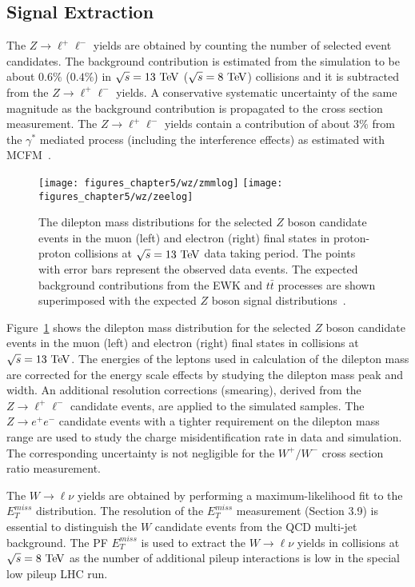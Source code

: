 \subsection{Signal Extraction}

The $Z\rightarrow \ell^{+}\ell^{-}$ yields are obtained by counting the number of selected event candidates. The background contribution is estimated from the simulation to be about $0.6\%$ ($0.4\%$) in $\sqrt{s}=13~\mathrm{Te\kern -0.1em V}$ ($\sqrt{s}=8~\mathrm{Te\kern -0.1em V}$) collisions and it is subtracted from the $Z\rightarrow \ell^{+}\ell^{-}$ yields. A conservative systematic uncertainty of the same magnitude as the background contribution is propagated to the cross section measurement. The $Z\rightarrow \ell^{+}\ell^{-}$ yields contain a contribution of about $3\%$ from the $\gamma^{*}$ mediated process (including the interference effects) as estimated with MCFM~\cite{Campbell:2010ff}. 
\begin{figure}[htbp]
\centering
\texttt{[image: figures\_chapter5/wz/zmmlog]}
\texttt{[image: figures\_chapter5/wz/zeelog]}
\caption{The dilepton mass distributions for the selected $Z$ boson candidate events in the muon (left) and electron (right) final states in proton-proton collisions at $\sqrt{s}=13~\mathrm{Te\kern -0.1em V}$ data taking period. The points with error bars represent the observed data events. The expected background contributions from the EWK and $t\bar{t}$ processes are shown superimposed with the expected $Z$ boson signal distributions~\cite{CMS-PAS-SMP-15-004}. 
\label{fig:z13}}
\end{figure}
Figure~\ref{fig:z13} shows the dilepton mass distribution for the selected $Z$ boson candidate events in the muon (left) and electron (right) final states in collisions at $\sqrt{s}=13~\mathrm{Te\kern -0.1em V}$. The energies of the leptons used in calculation of the dilepton mass are corrected for the energy scale effects by studying the dilepton mass peak and width. An additional resolution corrections (smearing), derived from the $Z \rightarrow \ell^{+}\ell^{-}$ candidate events, are applied to the simulated samples. The  $Z \rightarrow e^{+}e^{-}$ candidate events with a tighter requirement on the dilepton mass range are used to study the charge misidentification rate in data and simulation. The corresponding uncertainty is not negligible for the $W^+/W^-$ cross section ratio measurement.      
 
 The $W \rightarrow \ell \nu$ yields are obtained by performing a maximum-likelihood fit to the $E_{T}^{miss}$ distribution. The resolution of the $E_{T}^{miss}$ measurement (Section 3.9) is essential to distinguish the $W$ candidate events from the QCD multi-jet background. The PF $E_{T}^{miss}$ is used to extract the $W \rightarrow \ell \nu$ yields in collisions at $\sqrt{s}=8~\mathrm{Te\kern -0.1em V}$ as the number of additional pileup interactions is low in the special low pileup LHC run. 
 
